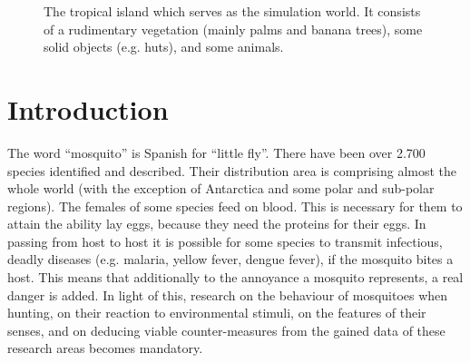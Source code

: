 \documentclass{sig-alternate-05-2015}
\begin{document}
\begin{figure}[bth!]
{}

\caption{The tropical island which serves as the simulation world. It consists of a rudimentary vegetation (mainly palms and banana trees), some solid objects (e.g. huts), and some animals.}
\label{fig:island_several}
\end{figure}

\section{Introduction}
\noindent
The word ``mosquito'' is Spanish for ``little fly''\cite{howstuff}. There have been over 2.700 species identified and described. Their distribution area is comprising almost the whole world (with the exception of Antarctica and some polar and sub-polar regions). The females of some species feed on blood. This is necessary for them to attain the ability lay eggs, because they need the proteins for their eggs. In passing from host to host it is possible for some species to transmit infectious, deadly diseases (e.g. malaria, yellow fever, dengue fever), if the mosquito bites a host. This means that additionally to the annoyance a mosquito represents, a real danger is added. In light of this, research on the behaviour of mosquitoes when hunting, on their reaction to environmental stimuli, on the features of their senses, and on deducing viable counter-measures from the gained data of these research areas becomes mandatory. 
\end{document}

